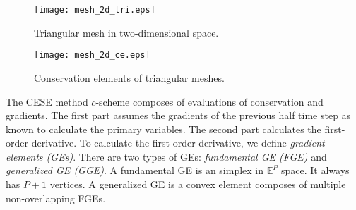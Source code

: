 \documentclass[11pt,dvips]{article}
\numberwithin{equation}{section}
\begin{document}
%
\begin{figure}[h]
\centering
\texttt{[image: mesh\_2d\_tri.eps]}
\caption{Triangular mesh in two-dimensional space.}
\label{f:mesh_2d_tri}
\end{figure}

\begin{figure}[h]
\centering
\texttt{[image: mesh\_2d\_ce.eps]}
\caption{Conservation elements of triangular meshes.}
\label{f:mesh_2d_ce}
\end{figure}
%

\clearpage

The CESE method $c$-scheme composes of evaluations of conservation and
gradients.  The first part assumes the gradients of the previous half time step
as known to calculate the primary variables.  The second part calculates the
first-order derivative.  To calculate the first-order derivative, we define
\textit{gradient elements (GEs)}.  There are two types of GEs:
\textit{fundamental GE (FGE)} and \textit{generalized GE (GGE)}.  A fundamental
GE is an simplex in $\mathbb{E}^P$ space.  It always has $P+1$ vertices.  A
generalized GE is a convex element composes of multiple non-overlapping FGEs.
\end{document}
